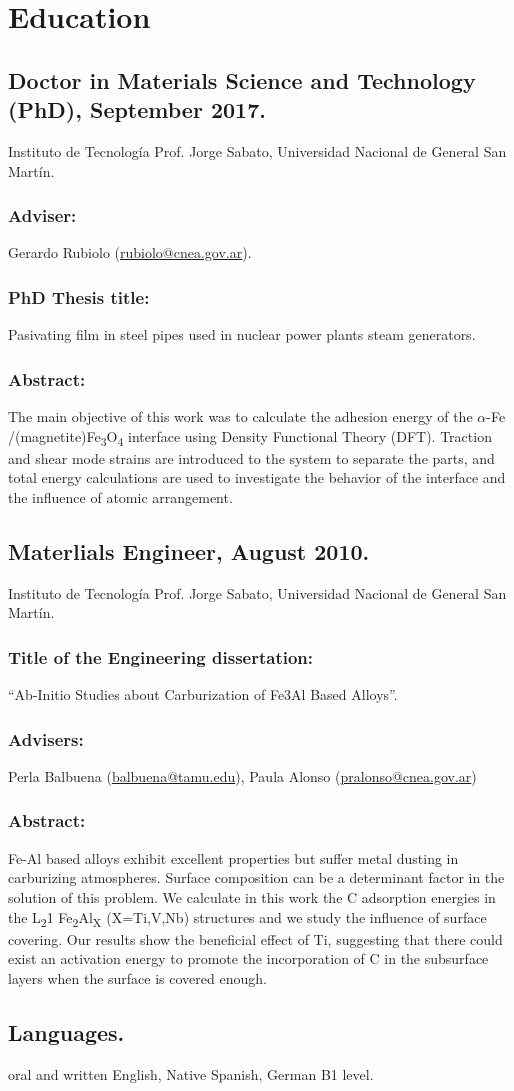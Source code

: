 \section{Education}

\subsection{Doctor in Materials Science and Technology (PhD), September 2017.}
Instituto de Tecnología Prof. Jorge Sabato, Universidad Nacional de General San
Martín. \subsubsection{Adviser:} Gerardo Rubiolo (\url{rubiolo@cnea.gov.ar}).
\subsubsection{PhD Thesis title:} Pasivating film in steel pipes used in nuclear
power plants steam generators.  \subsubsection{Abstract:} The main objective of
this work was to calculate the adhesion energy of the $\alpha$-Fe
/(magnetite)Fe\textsubscript{3}O\textsubscript{4} interface using Density
Functional Theory (DFT). Traction and shear mode strains are introduced to the
system to separate the parts, and total energy calculations are used to
investigate the behavior of the interface and the influence of atomic
arrangement.

\subsection{Materlials Engineer, August 2010.} Instituto de Tecnología Prof.
Jorge Sabato, Universidad Nacional de General San Martín.  \subsubsection{Title
of the Engineering dissertation:} “Ab-Initio Studies about Carburization of
Fe3Al Based Alloys”.  \subsubsection{Advisers:} Perla Balbuena
(\url{balbuena@tamu.edu}), Paula Alonso (\url{pralonso@cnea.gov.ar})
\subsubsection{Abstract:} Fe-Al based alloys exhibit excellent properties but
suffer metal dusting in carburizing atmospheres. Surface composition can be a
determinant factor in the solution of this problem. We calculate in this work
the C adsorption energies in the L\textsubscript{2}1
Fe\textsubscript{2}Al\textsubscript{X} (X=Ti,V,Nb) structures and we study the
influence of surface covering. Our results show the beneficial effect of Ti,
suggesting that there could exist an activation energy to promote the
incorporation of C in the subsurface layers when the surface is covered enough.
\subsection{Languages.} oral and written English, Native Spanish, German B1 level.

